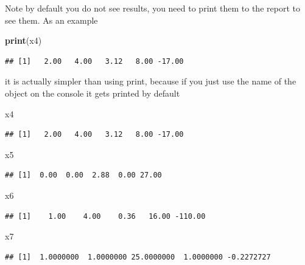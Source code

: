\documentclass[
]{article}
\newenvironment{Shaded}{\begin{snugshade}}{\end{snugshade}}
\newcommand{\FunctionTok}[1]{\textcolor[rgb]{0.13,0.29,0.53}{\textbf{#1}}}
\newcommand{\NormalTok}[1]{#1}
\begin{document}
Note by default you do not see results, you need to print them to the
report to see them. As an example

\begin{Shaded}
\begin{Highlighting}[]
\FunctionTok{print}\NormalTok{(x4)}
\end{Highlighting}
\end{Shaded}

\begin{verbatim}
## [1]   2.00   4.00   3.12   8.00 -17.00
\end{verbatim}

it is actually simpler than using print, because if you just use the
name of the object on the console it gets printed by default

\begin{Shaded}
\begin{Highlighting}[]
\NormalTok{x4}
\end{Highlighting}
\end{Shaded}

\begin{verbatim}
## [1]   2.00   4.00   3.12   8.00 -17.00
\end{verbatim}

\begin{Shaded}
\begin{Highlighting}[]
\NormalTok{x5}
\end{Highlighting}
\end{Shaded}

\begin{verbatim}
## [1]  0.00  0.00  2.88  0.00 27.00
\end{verbatim}

\begin{Shaded}
\begin{Highlighting}[]
\NormalTok{x6}
\end{Highlighting}
\end{Shaded}

\begin{verbatim}
## [1]    1.00    4.00    0.36   16.00 -110.00
\end{verbatim}

\begin{Shaded}
\begin{Highlighting}[]
\NormalTok{x7}
\end{Highlighting}
\end{Shaded}

\begin{verbatim}
## [1]  1.0000000  1.0000000 25.0000000  1.0000000 -0.2272727
\end{verbatim}
\end{document}
